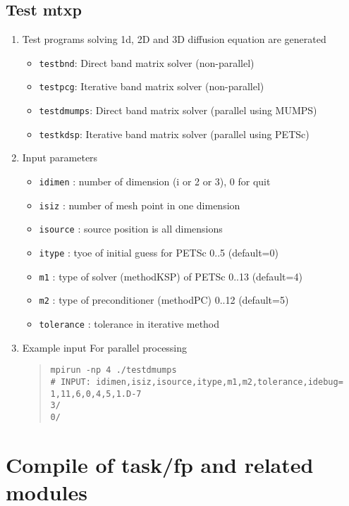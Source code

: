 \documentclass[11pt]{article}
\begin{document}
\subsection{Test mtxp}
\begin{enumerate}
\item
Test programs solving 1d, 2D and 3D diffusion equation are generated
\begin{itemize}
\item
\verb|testbnd|: Direct band matrix solver (non-parallel)
\item
\verb|testpcg|: Iterative band matrix solver (non-parallel)
\item
\verb|testdmumps|: Direct band matrix solver (parallel using MUMPS)
\item
\verb|testkdsp|: Iterative band matrix solver (parallel using PETSc)
\end{itemize}
\item
Input parameters
\begin{itemize}
\item
\verb|idimen| : number of dimension (i or 2 or 3),  0 for quit
\item
\verb|isiz| : number of mesh point in one dimension
\item
\verb|isource| : source position is all dimensions
\item
\verb|itype| : tyoe of initial guess for PETSc  0..5 (default=0)
\item
\verb|m1| : type of solver (methodKSP) of PETSc  0..13 (default=4)
\item
\verb|m2| : type of preconditioner (methodPC)  0..12 (default=5)
\item
\verb|tolerance| : tolerance in iterative method
\end{itemize}
\item
Example input For parallel processing
\begin{quote}
\begin{verbatim}
mpirun -np 4 ./testdmumps
# INPUT: idimen,isiz,isource,itype,m1,m2,tolerance,idebug= 
1,11,6,0,4,5,1.D-7
3/
0/
\end{verbatim}
\end{quote}
\end{enumerate}

\section{Compile of task/fp and related modules}
\end{document}

